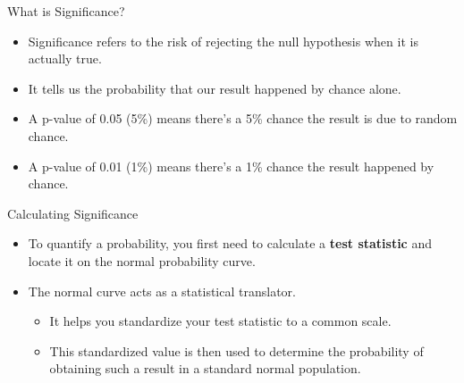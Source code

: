 \documentclass[
  ignorenonframetext,
]{beamer}
\providecommand{\tightlist}{%
  \setlength{\itemsep}{0pt}\setlength{\parskip}{0pt}}
\begin{document}
\begin{frame}{What is Significance?}
\label{what-is-significance-1}
\begin{itemize}
\tightlist
\item
  Significance refers to the risk of rejecting the null hypothesis when
  it is actually true.
\end{itemize}

\begin{itemize}
\tightlist
\item
  It tells us the probability that our result happened by chance alone.
\end{itemize}

\begin{itemize}
\tightlist
\item
  A p-value of 0.05 (5\%) means there's a 5\% chance the result is due
  to random chance.
\end{itemize}

\begin{itemize}
\tightlist
\item
  A p-value of 0.01 (1\%) means there's a 1\% chance the result happened
  by chance.
\end{itemize}
\end{frame}

\begin{frame}{Calculating Significance}
\label{calculating-significance}
\begin{itemize}
\item
  To quantify a probability, you first need to calculate a \textbf{test
  statistic} and locate it on the normal probability curve.
\item
  The normal curve acts as a statistical translator.

  \begin{itemize}
  \tightlist
  \item
    It helps you standardize your test statistic to a common scale.
  \item
    This standardized value is then used to determine the probability of
    obtaining such a result in a standard normal population.
  \end{itemize}
\end{itemize}
\end{frame}
\end{document}
